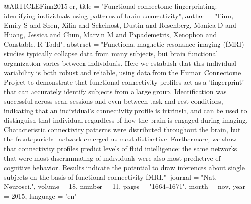 @ARTICLE{Finn2015-er,
	title    = "Functional connectome fingerprinting: identifying individuals
	using patterns of brain connectivity",
	author   = "Finn, Emily S and Shen, Xilin and Scheinost, Dustin and
	Rosenberg, Monica D and Huang, Jessica and Chun, Marvin M and
	Papademetris, Xenophon and Constable, R Todd",
	abstract = "Functional magnetic resonance imaging (fMRI) studies typically
	collapse data from many subjects, but brain functional
	organization varies between individuals. Here we establish that
	this individual variability is both robust and reliable, using
	data from the Human Connectome Project to demonstrate that
	functional connectivity profiles act as a 'fingerprint' that can
	accurately identify subjects from a large group. Identification
	was successful across scan sessions and even between task and
	rest conditions, indicating that an individual's connectivity
	profile is intrinsic, and can be used to distinguish that
	individual regardless of how the brain is engaged during imaging.
	Characteristic connectivity patterns were distributed throughout
	the brain, but the frontoparietal network emerged as most
	distinctive. Furthermore, we show that connectivity profiles
	predict levels of fluid intelligence: the same networks that were
	most discriminating of individuals were also most predictive of
	cognitive behavior. Results indicate the potential to draw
	inferences about single subjects on the basis of functional
	connectivity fMRI.",
	journal  = "Nat. Neurosci.",
	volume   =  18,
	number   =  11,
	pages    = "1664--1671",
	month    =  nov,
	year     =  2015,
	language = "en"
}

